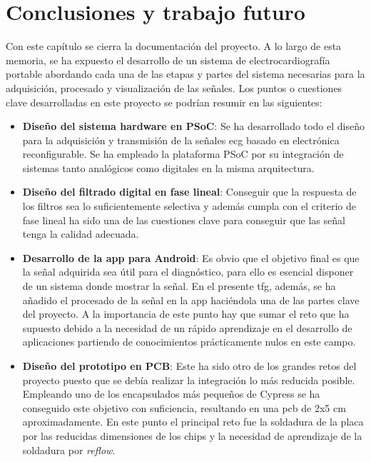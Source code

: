 \chapter{Conclusiones y trabajo futuro}\label{sec: Conclusione}

\makeatletter
\def\clearpage{%
  \ifvmode
    \ifnum \@dbltopnum =\m@ne
      \ifdim \pagetotal <\topskip
        \hbox{}
      \fi
    \fi
  \fi
  \newpage
  \thispagestyle{empty}
  \write\m@ne{}
  \vbox{}
  \penalty -\@Mi
}
\makeatother

Con este capítulo se cierra la documentación del proyecto. A lo largo de esta memoria, se ha expuesto el desarrollo de un sistema de electrocardiografía portable abordando cada una de las etapas y partes del sistema necesarias para la adquisición, procesado y visualización de las señales. Los puntos o cuestiones clave desarrolladas en este proyecto se podrían resumir en las siguientes:

\begin{itemize}
	\item \textbf{Diseño del sistema hardware en PSoC}: Se ha desarrollado todo el diseño para la adquisición y transmisión de la señales \acrshort{ecg} basado en electrónica reconfigurable. Se ha empleado la plataforma PSoC por su integración de sistemas tanto analógicos como digitales en la misma arquitectura.
	
	\item \textbf{Diseño del filtrado digital en fase lineal}: Conseguir que la respuesta de los filtros sea lo suficientemente selectiva y además cumpla con el criterio de fase lineal ha sido una de las cuestiones clave para conseguir que las señal tenga la calidad adecuada.
	
	\item \textbf{Desarrollo de la app para Android}: Es obvio que el objetivo final es que la señal adquirida sea útil para el diagnóstico, para ello es esencial disponer de un sistema donde mostrar la señal. En el presente \acrshort{tfg}, además, se ha añadido el procesado de la señal en la app haciéndola una de las partes clave del proyecto. A la importancia de este punto hay que sumar el reto que ha supuesto debido a la necesidad de un rápido aprendizaje en el desarrollo de aplicaciones partiendo de conocimientos prácticamente nulos en este campo.

	
	\item \textbf{Diseño del prototipo en PCB}: Este ha sido otro de los grandes retos del proyecto puesto que se debía realizar la integración lo más reducida posible. Empleando uno de los encapsulados más pequeños de Cypress se ha conseguido este objetivo con suficiencia, resultando en una \acrshort{pcb} de 2x5 cm aproximadamente. En este punto el principal reto fue la soldadura de la placa por las reducidas dimensiones de los chips y la necesidad de aprendizaje de la soldadura por \textit{reflow}.
	
\end{itemize}

